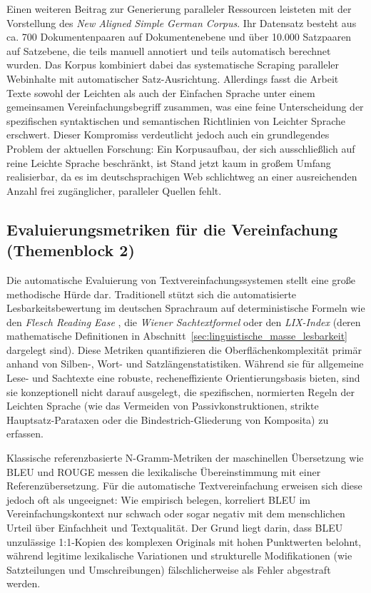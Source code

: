 Einen weiteren Beitrag zur Generierung paralleler Ressourcen leisteten \citet{toborek2023new} mit der Vorstellung des \textit{New Aligned Simple German Corpus}. Ihr Datensatz besteht aus ca. 700 Dokumentenpaaren auf Dokumentenebene und über 10.000 Satzpaaren auf Satzebene, die teils manuell annotiert und teils automatisch berechnet wurden. Das Korpus kombiniert dabei das systematische Scraping paralleler Webinhalte mit automatischer Satz-Ausrichtung. Allerdings fasst die Arbeit Texte sowohl der Leichten als auch der Einfachen Sprache unter einem gemeinsamen Vereinfachungsbegriff zusammen, was eine feine Unterscheidung der spezifischen syntaktischen und semantischen Richtlinien von Leichter Sprache erschwert. Dieser Kompromiss verdeutlicht jedoch auch ein grundlegendes Problem der aktuellen Forschung: Ein Korpusaufbau, der sich ausschließlich auf reine Leichte Sprache beschränkt, ist Stand jetzt kaum in großem Umfang realisierbar, da es im deutschsprachigen Web schlichtweg an einer ausreichenden Anzahl frei zugänglicher, paralleler Quellen fehlt.

\subsection{Evaluierungsmetriken für die Vereinfachung (Themenblock 2)}
\label{sec:evaluierungsmetriken}

Die automatische Evaluierung von Textvereinfachungssystemen stellt eine große methodische Hürde dar. Traditionell stützt sich die automatisierte Lesbarkeitsbewertung im deutschen Sprachraum auf deterministische Formeln wie den \textit{Flesch Reading Ease} \citep{amstad1978verstaendlich}, die \textit{Wiener Sachtextformel} \citep{bamberger1984lesen} oder den \textit{LIX-Index} \citep{bjornsson1968readability} (deren mathematische Definitionen in Abschnitt~\ref{sec:linguistische_masse_lesbarkeit} dargelegt sind). Diese Metriken quantifizieren die Oberflächenkomplexität primär anhand von Silben-, Wort- und Satzlängenstatistiken. Während sie für allgemeine Lese- und Sachtexte eine robuste, recheneffiziente Orientierungsbasis bieten, sind sie konzeptionell nicht darauf ausgelegt, die spezifischen, normierten Regeln der Leichten Sprache (wie das Vermeiden von Passivkonstruktionen, strikte Hauptsatz-Parataxen oder die Bindestrich-Gliederung von Komposita) zu erfassen.

Klassische referenzbasierte N-Gramm-Metriken der maschinellen Übersetzung wie BLEU \citep{papineni2002bleu} und ROUGE \citep{lin2004rouge} messen die lexikalische Übereinstimmung mit einer Referenzübersetzung. Für die automatische Textvereinfachung erweisen sich diese jedoch oft als ungeeignet: Wie \citet{alva2021unsuitability} empirisch belegen, korreliert BLEU im Vereinfachungskontext nur schwach oder sogar negativ mit dem menschlichen Urteil über Einfachheit und Textqualität. Der Grund liegt darin, dass BLEU unzulässige 1:1-Kopien des komplexen Originals mit hohen Punktwerten belohnt, während legitime lexikalische Variationen und strukturelle Modifikationen (wie Satzteilungen und Umschreibungen) fälschlicherweise als Fehler abgestraft werden.

